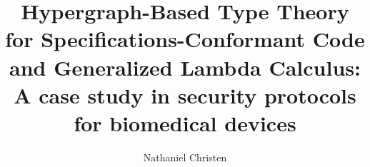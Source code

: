 \documentclass[11pt,twocolumn]{article}
\begin{document}
\title{Hypergraph-Based Type Theory for Specifications-Conformant Code and
Generalized Lambda Calculus: A case study in security protocols 
for biomedical devices}
\author{Nathaniel Christen}
\twocolumn[\begin{@twocolumnfalse}
\maketitle{}
\begin{abstract}\end{abstract}
\decoline{}
\vspace{3em}
\end{@twocolumnfalse}]

%
%
%
%
%
%
\end{document}
